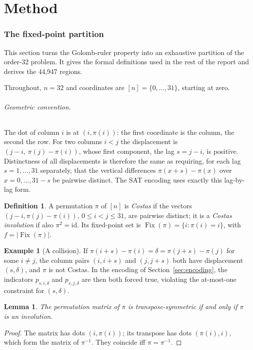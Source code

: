 \documentclass[11pt,a4paper]{article}
\newtheorem{lemma}[theorem]{Lemma}
\theoremstyle{definition}
\newtheorem{definition}[theorem]{Definition}
\newtheorem{example}[theorem]{Example}
\newcommand{\Fix}{\operatorname{Fix}}
\begin{document}
\part{Method}

\section{The fixed-point partition}\label{sec:framework}
This section turns the Golomb-ruler property into an exhaustive partition of the order-32 problem. It gives the formal definitions used in the rest of the report and derives the 44{,}947 regions.


Throughout, $n=32$ and coordinates are $[n]=\{0,\dots,31\}$, starting at zero.

\paragraph{Geometric convention.} The dot of column $i$ is at $(i,\pi(i))$: the first
coordinate is the column, the second the row. For two columns $i<j$ the displacement is
$(j-i,\ \pi(j)-\pi(i))$, whose first component, the lag $s=j-i$, is positive.
Distinctness of all displacements is therefore the same as requiring, for each lag
$s=1,\dots,31$ separately, that the vertical differences $\pi(x+s)-\pi(x)$ over
$x=0,\dots,31-s$ be pairwise distinct. The SAT encoding uses exactly this lag-by-lag form.

\begin{definition}
A permutation $\pi$ of $[n]$ is \emph{Costas} if the vectors $(j-i,\pi(j)-\pi(i))$,
$0\le i<j\le 31$, are pairwise distinct; it is a \emph{Costas involution} if also
$\pi^2=\mathrm{id}$. Its fixed-point set is $\Fix(\pi)=\{i:\pi(i)=i\}$, with $f=|\Fix(\pi)|$.
\end{definition}

\begin{example}[A collision]
If $\pi(i+s)-\pi(i)=\delta=\pi(j+s)-\pi(j)$ for some $i\ne j$, the column pairs $(i,i+s)$
and $(j,j+s)$ both have displacement $(s,\delta)$, and $\pi$ is not Costas. In the encoding
of Section~\ref{sec:encoding}, the indicators $p_{s,i,\delta}$ and $p_{s,j,\delta}$ are then
both forced true, violating the at-most-one constraint for $(s,\delta)$.
\end{example}

\begin{lemma}\label{lem:sym}
The permutation matrix of $\pi$ is transpose-symmetric if and only if $\pi$ is an involution.
\end{lemma}
\begin{proof}
The matrix has dots $(i,\pi(i))$; its transpose has dots $(\pi(i),i)$, which form the matrix
of $\pi^{-1}$. They coincide iff $\pi=\pi^{-1}$.
\end{proof}
\end{document}
